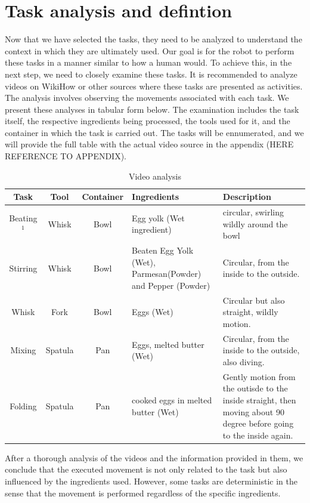\section*{Task analysis and defintion}
Now that we have selected the tasks, they need to be analyzed to understand the context in which they are ultimately used. 
Our goal is for the robot to perform these tasks in a manner similar to how a human would. 
To achieve this, in the next step, we need to closely examine these tasks. 
It is recommended to analyze videos on WikiHow or other sources where these tasks are presented as activities. 
The analysis involves observing the movements associated with each task. 
We present these analyses in tabular form below. The examination includes the task itself, the respective ingredients being processed, the tools used for it, and the container in which the task is carried out.
The tasks will be ennumerated, and we will provide the full table with the actual video source in the appendix (HERE REFERENCE TO APPENDIX).
    \begin{table}[H]
    \centering
    \begin{tabular}{|c|c|c|p{}|p{}|}
        \hline
        \textbf{Task} & \textbf{Tool} & \textbf{Container} & \textbf{Ingredients} & \textbf{Description} \\
        \hline
        Beating$^1$ & Whisk & Bowl & Egg yolk (Wet ingredient) & circular, swirling wildly around the bowl \\
        \hline
        Stirring & Whisk & Bowl & Beaten Egg Yolk (Wet), Parmesan(Powder) and Pepper (Powder) & Circular, from the inside to the outside. \\
        \hline
        Whisk & Fork & Bowl & Eggs (Wet) & Circular but also straight, wildly motion. \\
        \hline
        Mixing & Spatula & Pan & Eggs, melted butter (Wet) & Circular, from the inside to the outside, also diving. \\
        \hline
        Folding & Spatula & Pan & cooked eggs in melted butter (Wet) & Gently motion from the outisde to the inside straight, then moving about 90 degree before going to the inside again. \\
        \hline
      \end{tabular}
    \caption{Video analysis}
    \label{tab:videoanalysis}
  \end{table}


After a thorough analysis of the videos and the information provided in them, we conclude that the executed movement is not only related to the task but also influenced by the ingredients used. However, some tasks are deterministic in the sense that the movement is performed regardless of the specific ingredients.

